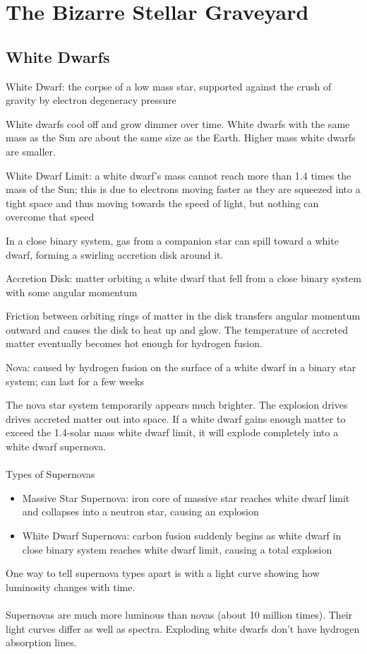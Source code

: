 \documentclass[12pt]{article}
\begin{document}
\section{The Bizarre Stellar Graveyard}
\subsection{White Dwarfs}
\begin{definition} White Dwarf: the corpse of a low mass star, supported against the crush of gravity by electron degeneracy pressure \end{definition}
White dwarfs cool off and grow dimmer over time. 
White dwarfs with the same mass as the Sun are about the same size as the Earth. Higher mass white dwarfs are smaller. 
\begin{definition} White Dwarf Limit: a white dwarf's mass cannot reach more than 1.4 times the mass of the Sun; this is due to electrons moving faster as they are squeezed into a tight space and thus moving towards the speed of light, but nothing can overcome that speed \end{definition}
In a close binary system, gas from a companion star can spill toward a white dwarf, forming a swirling accretion disk around it. 
\begin{definition} Accretion Disk: matter orbiting a white dwarf that fell from a close binary system with some angular momentum \end{definition}
Friction between orbiting rings of matter in the disk transfers angular momentum outward and causes the  disk to heat up and glow. The temperature of accreted matter eventually becomes hot enough for hydrogen fusion. 
\begin{definition} Nova: caused by hydrogen fusion on the surface of a white dwarf in a binary star system; can last for a few weeks \end{definition}
The nova star system temporarily appears much brighter. The explosion drives drives accreted matter out into space. If a white dwarf gains enough matter to exceed the 1.4-solar mass white dwarf limit, it will explode completely into a white dwarf supernova. \\~\\
Types of Supernovas \begin{itemize} 
\item Massive Star Supernova: iron core of massive star reaches white dwarf limit and collapses into a neutron star, causing an explosion 
\item White Dwarf Supernova: carbon fusion suddenly begins as white dwarf in close binary system reaches white dwarf limit, causing a total explosion \end{itemize}
One way to tell supernova types apart is with a light curve showing how luminosity changes with time. \\~\\
Supernovas are much more luminous than novas (about 10 million times). Their light curves differ as well as spectra. Exploding white dwarfs don't have hydrogen absorption lines. 
\end{document}
